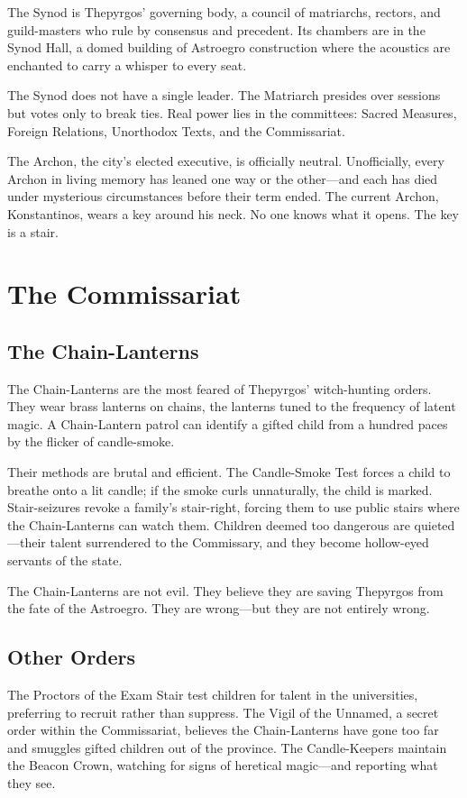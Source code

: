 \documentclass[10pt,twocolumn]{book}
\begin{document}
The Synod is Thepyrgos' governing body, a council of matriarchs, rectors, and guild-masters who rule by consensus and precedent. Its chambers are in the Synod Hall, a domed building of Astroegro construction where the acoustics are enchanted to carry a whisper to every seat.

The Synod does not have a single leader. The Matriarch presides over sessions but votes only to break ties. Real power lies in the committees: Sacred Measures, Foreign Relations, Unorthodox Texts, and the Commissariat.

The Archon, the city's elected executive, is officially neutral. Unofficially, every Archon in living memory has leaned one way or the other---and each has died under mysterious circumstances before their term ended. The current Archon, Konstantinos, wears a key around his neck. No one knows what it opens. The key is a stair.

\section{The Commissariat}

\subsection{The Chain-Lanterns}

The Chain-Lanterns are the most feared of Thepyrgos' witch-hunting orders. They wear brass lanterns on chains, the lanterns tuned to the frequency of latent magic. A Chain-Lantern patrol can identify a gifted child from a hundred paces by the flicker of candle-smoke.

Their methods are brutal and efficient. The Candle-Smoke Test forces a child to breathe onto a lit candle; if the smoke curls unnaturally, the child is marked. Stair-seizures revoke a family's stair-right, forcing them to use public stairs where the Chain-Lanterns can watch them. Children deemed too dangerous are quieted---their talent surrendered to the Commissary, and they become hollow-eyed servants of the state.

The Chain-Lanterns are not evil. They believe they are saving Thepyrgos from the fate of the Astroegro. They are wrong---but they are not entirely wrong.

\subsection{Other Orders}

The Proctors of the Exam Stair test children for talent in the universities, preferring to recruit rather than suppress. The Vigil of the Unnamed, a secret order within the Commissariat, believes the Chain-Lanterns have gone too far and smuggles gifted children out of the province. The Candle-Keepers maintain the Beacon Crown, watching for signs of heretical magic---and reporting what they see.
\end{document}
